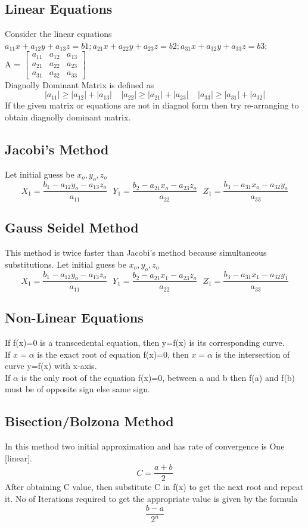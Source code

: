 \subsection{Linear Equations}
Consider the linear equations \(a_{11}x + a_{12}y + a_{13}z = b1; a_{21}x + a_{22}y + a_{23}z = b2; a_{31}x + a_{32}y + a_{33}z = b3;\)\\
A = 
$\begin{bmatrix}
a_{11} & a_{12} & a_{13}\\
a_{21} & a_{22} & a_{23}\\
a_{31} & a_{32} & a_{33}
\end{bmatrix}$\\
Diagnolly Dominant Matrix is defined as \[|a_{11}|\geq|a_{12}|+|a_{13}|\ \ \ \ \ |a_{22}|\geq|a_{21}|+|a_{23}|\ \ \ \ \ |a_{33}|\geq|a_{31}|+|a_{32}| \]
If the given matrix or equations are not in diagnol form then try re-arranging to obtain diagnolly dominant matrix.

\subsection*{Jacobi's Method}
Let initial guess be \(x_o, y_o, z_o\)
\[X_1=\frac{b_1-a_{12}y_o-a_{13}z_o}{a_{11}}\ \ \ Y_1=\frac{b_2-a_{21}x_o-a_{23}z_o}{a_{22}}\ \ \ Z_1=\frac{b_3-a_{31}x_o-a_{32}y_o}{a_{33}}\]

\subsection*{Gauss Seidel Method}
This method is twice faster than Jacobi's method because simultaneous substitutions. Let initial guess be \(x_o, y_o, z_o\)
\[X_1=\frac{b_1-a_{12}y_o-a_{13}z_o}{a_{11}}\ \ \ Y_1=\frac{b_2-a_{21}x_1-a_{23}z_o}{a_{22}}\ \ \ Z_1=\frac{b_3-a_{31}x_1-a_{32}y_1}{a_{33}}\]


\subsection{Non-Linear Equations}
If f(x)=0 is a transcedental equation, then y=f(x) is its corresponding curve.\\
If \(x = \alpha\) is the exact root of equation f(x)=0, then \(x=\alpha\) is the intersection of curve y=f(x) with x-axis.\\
If \(\alpha\) is the only root of the equation f(x)=0, between a and b then f(a) and f(b) must be of opposite sign else same sign.


\subsection*{Bisection/Bolzona Method}
In this method two initial approximation and has rate of convergence is One [linear].
\[C=\frac{a+b}{2}\]
After obtaining C value, then substitute C in f(x) to  get the next root and repeat it.
No of Iterations required to get the appropriate value is given by the formula
\[\frac{b-a}{2^n}\]

